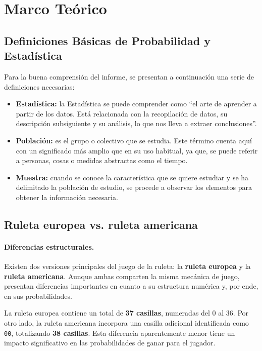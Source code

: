 \documentclass{article}
\begin{document}
\section{Marco Teórico}
\subsection{Definiciones Básicas de Probabilidad y Estadística}
\par Para la buena comprensión del informe, se presentan a continuación una serie de definiciones necesarias:
\begin{itemize}
    \item \textbf{Estadística:} la Estadística se puede comprender como ``el arte de aprender a partir de los datos. Está relacionada con la recopilación de datos, su descripción subsiguiente y su análisis, lo que nos lleva a extraer conclusiones''.
    \item \textbf{Población:} es el grupo o colectivo que se estudia. Este término cuenta aquí con un significado más amplio que en su uso habitual, ya que, se puede referir a personas, cosas o medidas abstractas como el tiempo.
    \item \textbf{Muestra:} cuando se conoce la característica que se quiere estudiar y se ha delimitado la población de estudio, se procede a observar los elementos para obtener la información necesaria.
\end{itemize}

\subsection{Ruleta europea vs. ruleta americana}

\paragraph{Diferencias estructurales.}
Existen dos versiones principales del juego de la ruleta: la \textbf{ruleta europea} y la \textbf{ruleta americana}. Aunque ambas comparten la misma mecánica de juego, presentan diferencias importantes en cuanto a su estructura numérica y, por ende, en sus probabilidades.

La ruleta europea contiene un total de \textbf{37 casillas}, numeradas del 0 al 36. Por otro lado, la ruleta americana incorpora una casilla adicional identificada como \texttt{00}, totalizando \textbf{38 casillas}. Esta diferencia aparentemente menor tiene un impacto significativo en las probabilidades de ganar para el jugador.
\end{document}
